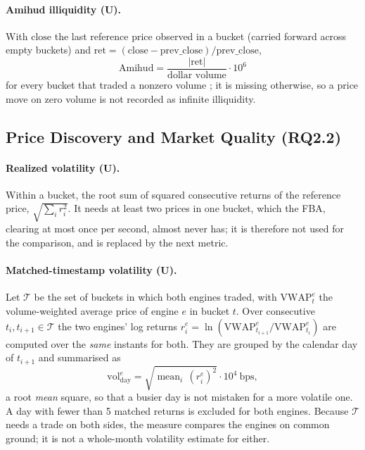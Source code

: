 \paragraph{Amihud illiquidity (U).} With $\mathrm{close}$ the last
reference price observed in a bucket (carried forward across empty
buckets) and $\mathrm{ret} = (\mathrm{close} -
\mathrm{prev\_close})/\mathrm{prev\_close}$,
\begin{equation}
  \label{eq:amihud}
  \mathrm{Amihud} = \frac{|\mathrm{ret}|}{\text{dollar volume}} \cdot 10^{6}
\end{equation}
for every bucket that traded a nonzero volume \citep{amihud2002illiquidity};
it is missing otherwise, so a price move on zero volume is not recorded as
infinite illiquidity.

\subsection{Price Discovery and Market Quality (RQ2.2)}
\label{sec:formularq22}

\paragraph{Realized volatility (U).} Within a bucket, the root sum of
squared consecutive returns of the reference price,
$\sqrt{\sum_i r_i^2}$. It needs at least two prices in one bucket, which
the FBA, clearing at most once per second, almost never has; it is
therefore not used for the comparison, and is replaced by the next metric.

\paragraph{Matched-timestamp volatility (U).} Let $\mathcal{T}$ be the set
of buckets in which both engines traded, with $\mathrm{VWAP}^{e}_t$ the
volume-weighted average price of engine $e$ in bucket $t$. Over
consecutive $t_i, t_{i+1} \in \mathcal{T}$ the two engines' log returns
$r^{e}_i = \ln(\mathrm{VWAP}^{e}_{t_{i+1}} / \mathrm{VWAP}^{e}_{t_i})$ are
computed over the \emph{same} instants for both. They are grouped by the
calendar day of $t_{i+1}$ and summarised as
\begin{equation}
  \label{eq:matchedvol}
  \mathrm{vol}^{e}_{\text{day}} = \sqrt{\operatorname{mean}_i\, (r^{e}_i)^2}
  \cdot 10^{4}\ \text{bps},
\end{equation}
a root \emph{mean} square, so that a busier day is not mistaken for a more
volatile one. A day with fewer than 5 matched returns is excluded for both
engines. Because $\mathcal{T}$ needs a trade on both sides, the measure
compares the engines on common ground; it is not a whole-month volatility
estimate for either.

